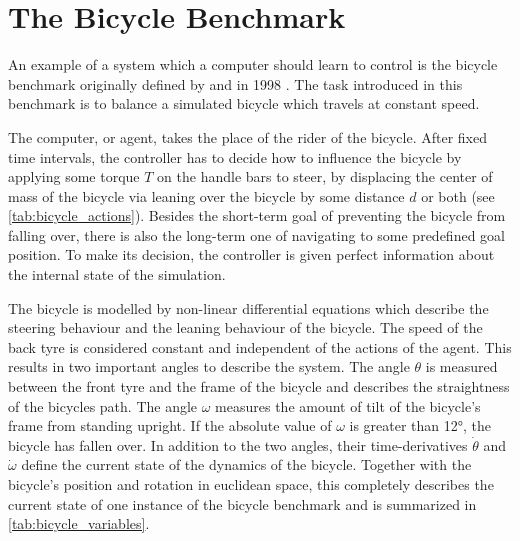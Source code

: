 \chapter{The Bicycle Benchmark}
\label{cha:the_bicycle_benchmark}

An example of a system which a computer should learn to control is the bicycle benchmark originally defined by \Randlov and \Alstrom in 1998 \cite{randlov_learning_1998}.
The task introduced in this benchmark is to balance a simulated bicycle which travels at constant speed.

The computer, or agent, takes the place of the rider of the bicycle.
After fixed time intervals, the controller has to decide how to influence the bicycle by applying some torque $T$ on the handle bars to steer, by displacing the center of mass of the bicycle via leaning over the bicycle by some distance $d$ or both (see \cref{tab:bicycle_actions}).
Besides the short-term goal of preventing the bicycle from falling over, there is also the long-term one of navigating to some predefined goal position.
To make its decision, the controller is given perfect information about the internal state of the simulation.

The bicycle is modelled by non-linear differential equations which describe the steering behaviour and the leaning behaviour of the bicycle.
The speed of the back tyre is considered constant and independent of the actions of the agent.
This results in two important angles to describe the system.
The angle $\theta$ is measured between the front tyre and the frame of the bicycle and describes the straightness of the bicycles path.
The angle $\omega$ measures the amount of tilt of the bicycle's frame from standing upright.
If the absolute value of $\omega$ is greater than \ang{12}, the bicycle has fallen over.
In addition to the two angles, their time-derivatives $\dot{\theta}$ and $\dot{\omega}$ define the current state of the dynamics of the bicycle.
Together with the bicycle's position and rotation in euclidean space, this completely describes the current state of one instance of the bicycle benchmark and is summarized in \cref{tab:bicycle_variables}.

